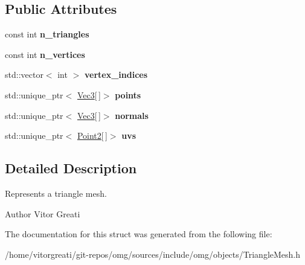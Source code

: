 \subsection*{Public Attributes}
\begin{DoxyCompactItemize}
\item 
\mbox{\label{structomg_1_1_triangle_mesh_a7ead07a90b3a63a39103f10f64958f84}} 
const int {\bfseries n\+\_\+triangles}
\item 
\mbox{\label{structomg_1_1_triangle_mesh_a2a411a56a3a866435604845a7e01cfcc}} 
const int {\bfseries n\+\_\+vertices}
\item 
\mbox{\label{structomg_1_1_triangle_mesh_ae98575726e9ed88cb9c20bfccef66094}} 
std\+::vector$<$ int $>$ {\bfseries vertex\+\_\+indices}
\item 
\mbox{\label{structomg_1_1_triangle_mesh_abaa3dc4be890e4a08ee2267d52e25404}} 
std\+::unique\+\_\+ptr$<$ \mbox{\hyperlink{namespaceomg_a45a9482677fee9933ff369b49894e316}{Vec3}}\mbox{[}$\,$\mbox{]}$>$ {\bfseries points}
\item 
\mbox{\label{structomg_1_1_triangle_mesh_ab04183e23af3c094145e26a363f9bdfa}} 
std\+::unique\+\_\+ptr$<$ \mbox{\hyperlink{namespaceomg_a45a9482677fee9933ff369b49894e316}{Vec3}}\mbox{[}$\,$\mbox{]}$>$ {\bfseries normals}
\item 
\mbox{\label{structomg_1_1_triangle_mesh_a7ed2552b0fb9512c6ed04664ac559be3}} 
std\+::unique\+\_\+ptr$<$ \mbox{\hyperlink{namespaceomg_a18e42fb7bbc4159e9137145b866ec578}{Point2}}\mbox{[}$\,$\mbox{]}$>$ {\bfseries uvs}
\end{DoxyCompactItemize}


\subsection{Detailed Description}
Represents a triangle mesh. 

\begin{DoxyAuthor}{Author}
Vitor Greati 
\end{DoxyAuthor}


The documentation for this struct was generated from the following file\+:\begin{DoxyCompactItemize}
\item 
/home/vitorgreati/git-\/repos/omg/sources/include/omg/objects/Triangle\+Mesh.\+h\end{DoxyCompactItemize}
